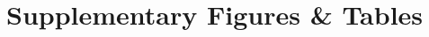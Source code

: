 \documentclass[onecolumn, compsoc,10pt]{IEEEtran}
\begin{document}





\clearpage                                                                      
\setcounter{figure}{0}
\renewcommand{\figurename}{Extended Data Figure}                               
\setcounter{table}{0}                                     
\renewcommand{\tablename}{Extended Data Table}                                 
%

\clearpage



\section*{Supplementary Figures \& Tables}

%
\end{document}

